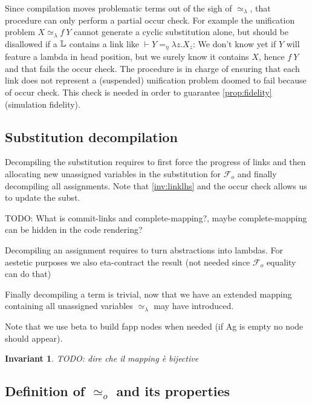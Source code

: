 \documentclass[sigconf,natbib=false,review]{acmart}
\newtheorem{invariant}{Invariant}
\newcommand{\UnifRel}{\ensuremath{\simeq}}
\newcommand{\Uo}{\ensuremath{\UnifRel_o}\xspace}
\newcommand{\Ue}{\ensuremath{\UnifRel_\lambda}\xspace}
\newcommand{\Fo}{\ensuremath{\mathcal{F}_{\!o}\xspace}} %
\newcommand{\linketaM}[3]{\ensuremath{#1 \vdash #2 =_\eta #3}}
\begin{document}
Since compilation moves problematic terms out of the sigh of \Ue{},
that procedure can only perform a partial occur check. For example the
unification problem $X \Ue f~Y$ cannot generate a cyclic substitution alone,
but should be disallowed if a $\mathbb{L}$ contains a link like
$\linketaM{}{Y}{\lambda z.X_z}$: We don't know yet if $Y$ will feature
a lambda in head position, but we surely know it contains $X$, hence
$f~Y$ and that fails the occur check.
The procedure  is in charge of ensuring that
each link does not represent a (suspended) unification problem doomed
to fail because of occur check. This check is needed in order to
guarantee \cref{prop:fidelity} (simulation fidelity).

\subsection{Substitution decompilation}

Decompiling the substitution requires to first force the
progress of links and then allocating new unassigned variables
in the substitution for \Fo{} and finally decompiling all
assignments. Note that \cref{inv:linklhs} and the
occur check allows us to update the subst.




TODO: What is commit-links and complete-mapping?, maybe complete-mapping can be
hidden in the code rendering?

\noindent
Decompiling an assignment requires to turn abstractions into
lambdas. For aestetic purposes we also eta-contract the result
(not needed since \Fo{} equality can do that)



\noindent
Finally decompiling a term is trivial, now that we have an extended
mapping containing all unassigned variables \Ue may have introduced.



\noindent
Note that we use beta to build fapp nodes when needed (if Ag is empty
no  node should appear).


\begin{invariant}

  TODO: dire che il mapping è bijective
  \label{inv:map-bijective}
\end{invariant}

\subsection{Definition of \Uo and its properties}
\end{document}
